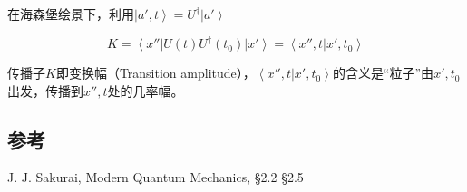 在海森堡绘景下，利用$\left| a' , t \right\rangle = U^\dagger \left| a' \right\rangle$

\begin{equation}
K = \left\langle x'' \right| U(t) U^\dagger (t_0 ) \left| x' \right\rangle = \left\langle x'', t | x', t_0 \right\rangle
\end{equation}

传播子$K$即变换幅（Transition amplitude），$\left\langle x'', t | x', t_0 \right\rangle$的含义是“粒子”由$x', t_0$出发，传播到$x'', t$处的几率幅。

\subsection*{参考}

J. J. Sakurai, Modern Quantum Mechanics, \S 2.2 \S 2.5